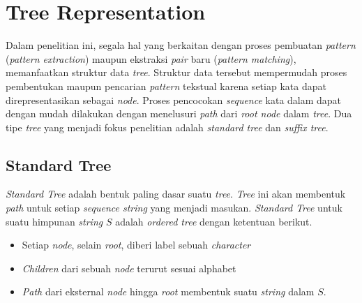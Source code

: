 \section{Tree Representation} 
Dalam penelitian ini, segala hal yang berkaitan dengan proses pembuatan \textit{pattern} (\textit{pattern extraction}) maupun ekstraksi \textit{pair} baru (\textit{pattern matching}), memanfaatkan struktur data \textit{tree}. Struktur data tersebut mempermudah proses pembentukan maupun pencarian \textit{pattern} tekstual karena setiap kata dapat direpresentasikan sebagai \textit{node}. Proses pencocokan \textit{sequence} kata dalam dapat dengan mudah dilakukan dengan menelusuri \textit{path} dari \textit{root node} dalam \textit{tree}. Dua tipe \textit{tree} yang menjadi fokus penelitian adalah \textit{standard tree} dan \textit{suffix tree}.

\subsection{Standard Tree} \label{sec:tree}
\textit{Standard Tree} \citep{weiss2010data} adalah bentuk paling dasar suatu \textit{tree}. \textit{Tree} ini akan membentuk \textit{path} untuk setiap \textit{sequence string} yang menjadi masukan. \textit{Standard Tree} untuk suatu himpunan \textit{string} $S$ adalah \textit{ordered tree} dengan ketentuan berikut.
\begin{itemize}
  \item Setiap \textit{node}, selain \textit{root}, diberi label sebuah \textit{character}
  \item \textit{Children} dari sebuah \textit{node} terurut sesuai alphabet
  \item \textit{Path} dari eksternal \textit{node} hingga \textit{root} membentuk suatu \textit{string} dalam $S$.
\end{itemize}

